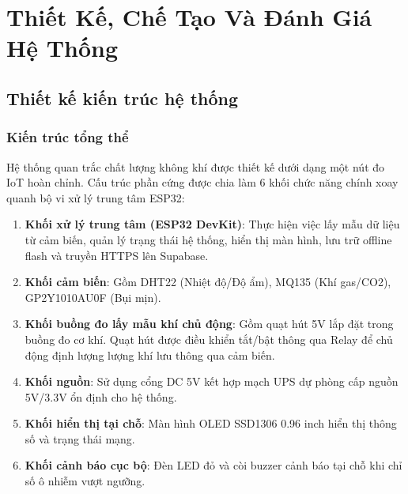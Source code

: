 \chapter{Thiết Kế, Chế Tạo Và Đánh Giá Hệ Thống}

\section{Thiết kế kiến trúc hệ thống}
\subsection{Kiến trúc tổng thể}
Hệ thống quan trắc chất lượng không khí được thiết kế dưới dạng một nút đo IoT hoàn chỉnh. Cấu trúc phần cứng được chia làm 6 khối chức năng chính xoay quanh bộ vi xử lý trung tâm ESP32:
\begin{enumerate}
    \item \textbf{Khối xử lý trung tâm (ESP32 DevKit)}: Thực hiện việc lấy mẫu dữ liệu từ cảm biến, quản lý trạng thái hệ thống, hiển thị màn hình, lưu trữ offline flash và truyền HTTPS lên Supabase.
    \item \textbf{Khối cảm biến}: Gồm DHT22 (Nhiệt độ/Độ ẩm), MQ135 (Khí gas/CO2), GP2Y1010AU0F (Bụi mịn).
    \item \textbf{Khối buồng đo lấy mẫu khí chủ động}: Gồm quạt hút 5V lắp đặt trong buồng đo cơ khí. Quạt hút được điều khiển tắt/bật thông qua Relay để chủ động định lượng lượng khí lưu thông qua cảm biến.
    \item \textbf{Khối nguồn}: Sử dụng cổng DC 5V kết hợp mạch UPS dự phòng cấp nguồn 5V/3.3V ổn định cho hệ thống.
    \item \textbf{Khối hiển thị tại chỗ}: Màn hình OLED SSD1306 0.96 inch hiển thị thông số và trạng thái mạng.
    \item \textbf{Khối cảnh báo cục bộ}: Đèn LED đỏ và còi buzzer cảnh báo tại chỗ khi chỉ số ô nhiễm vượt ngưỡng.
\end{enumerate}

